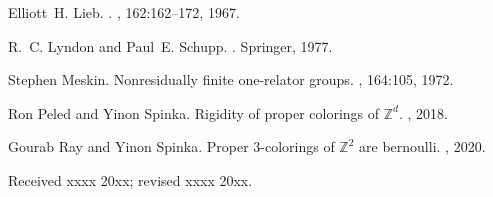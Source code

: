 \documentclass{aims}
\theoremstyle{definition}
\begin{document}
\begin{thebibliography}{10}
		Elliott~H. Lieb.
		.
		, 162:162--172, 1967.
		
		R.~C. Lyndon and Paul~E. Schupp.
		.
		\newblock Springer, 1977.
		
		Stephen Meskin.
		\newblock Nonresidually finite one-relator groups.
		, 164:105,
		1972.
		
		Ron Peled and Yinon Spinka.
		\newblock Rigidity of proper colorings of {$\mathbb{Z}^{d}$}.
		, 2018.
		
		Gourab Ray and Yinon Spinka.
		\newblock Proper 3-colorings of {$\mathbb{Z}^{2}$} are bernoulli.
		, 2020.
		
	\end{thebibliography}
	
	\medskip
	Received xxxx 20xx; revised xxxx 20xx.
	\medskip
	
\end{document}
